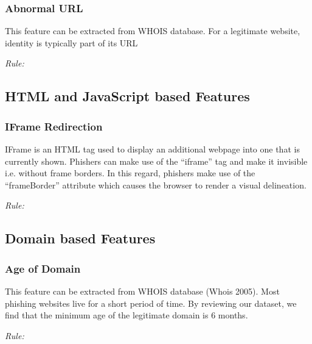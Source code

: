 \documentclass[twocolumn,10pt]{article}
\begin{document}
\subsubsection{Abnormal URL}

This feature can be extracted from WHOIS database. For a legitimate website, identity is typically
part of its URL
\begin{center}
	\it Rule:
\end{center}
\subsection{HTML and JavaScript based Features}
\subsubsection{IFrame Redirection}

IFrame is an HTML tag used to display an additional webpage into one that is currently shown.
Phishers can make use of the “iframe” tag and make it invisible i.e. without frame borders. In this
regard, phishers make use of the “frameBorder” attribute which causes the browser to render a visual
delineation. 
\begin{center}
\it Rule:
\end{center}
\subsection{Domain based Features}
\subsubsection{Age of Domain}

This feature can be extracted from WHOIS database (Whois 2005). Most phishing websites live for a short period of time. By reviewing our dataset, we find that the minimum age of the legitimate domain is 6 months. 
\begin{center}
\it Rule:
\end{center}
\end{document}
